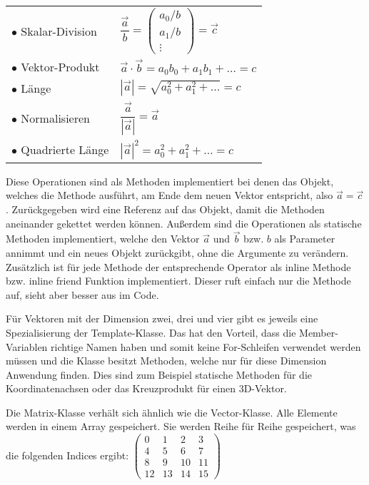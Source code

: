 \begin{longtable}[l]{ll}
		$\bullet$ Skalar-Division		& $\dfrac{\overrightarrow{a}}{b} = \begin{pmatrix} a_{0} / b \\ a_{1} / b\\ \vdots  \end{pmatrix} = \overrightarrow{c}$ \\
		$\bullet$ Vektor-Produkt		& $\overrightarrow{a} \cdot \overrightarrow{b} = a_{0}b_{0} + a_{1}b_{1} + \dots = c$\\
		$\bullet$ Länge		& $|\overrightarrow{a}| = \sqrt{a_{0}^{2}+a_{1}^{2}+\dots} = c$\\
		$\bullet$ Normalisieren			& $\dfrac{\overrightarrow{a}}{|\overrightarrow{a}|} = \overrightarrow{a}$\\
		$\bullet$ Quadrierte Länge		& $|\overrightarrow{a}|^{2} = a_{0}^{2}+a_{1}^{2}+\dots = c$\\
	\end{longtable}

Diese Operationen sind als Methoden implementiert bei denen das Objekt, welches die Methode ausführt, am Ende dem neuen Vektor entspricht, also $\overrightarrow{a} = \overrightarrow{c}$. Zurückgegeben wird eine Referenz auf das Objekt, damit die Methoden aneinander gekettet werden können. Außerdem sind die Operationen als statische Methoden implementiert, welche den Vektor $\overrightarrow{a}$ und  $\overrightarrow{b}$ bzw. $b$ als Parameter annimmt und ein neues Objekt zurückgibt, ohne die Argumente zu verändern. Zusätzlich ist für jede Methode der entsprechende Operator als inline Methode bzw. inline friend Funktion implementiert. Dieser ruft einfach nur die Methode auf, sieht aber besser aus im Code.

Für Vektoren mit der Dimension zwei, drei und vier gibt es jeweils eine Spezialisierung der Template-Klasse. Das hat den Vorteil, dass die Member-Variablen richtige Namen haben und somit keine For-Schleifen verwendet werden müssen und die Klasse besitzt Methoden, welche nur für diese Dimension Anwendung finden. Dies sind zum Beispiel statische Methoden für die Koordinatenachsen oder das Kreuzprodukt für einen 3D-Vektor.

Die Matrix-Klasse verhält sich ähnlich wie die Vector-Klasse. Alle Elemente werden in einem Array gespeichert. Sie werden Reihe für Reihe gespeichert, was die folgenden Indices ergibt: \newline
$\begin{pmatrix}
	0 & 1 & 2 & 3 \\
	4 & 5 & 6 & 7 \\
	8 & 9 & 10 & 11 \\
	12 & 13 & 14 & 15
\end{pmatrix}$

